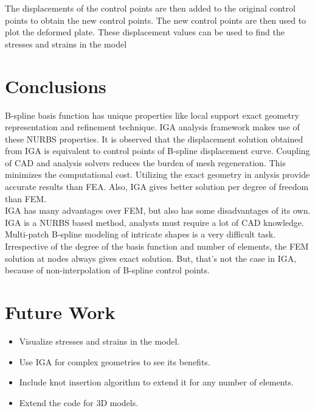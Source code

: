 \documentclass[submit,12pt]{aiaa-pretty} %
\begin{document}
The displacements of the control points are then added to the original control points to obtain the new control points. The new control points are then used to plot the deformed plate. These displacement values can be used to find the stresses and strains in the model

\section{Conclusions}
B-spline basis function has unique properties like local support exact geometry representation and refinement technique. IGA analysis framework makes use of these NURBS properties. It is observed that the displacement solution obtained from IGA is equivalent to control points of B-spline displacement curve. Coupling of CAD and analysis solvers reduces the burden of mesh regeneration. This minimizes the computational cost. Utilizing the exact geometry in anlysis provide accurate results than FEA. Also, IGA gives better solution per degree of freedom than FEM. \\
IGA has many advantages over FEM, but also has some disadvantages of its own. IGA is a NURBS based method, analysts must require a lot of CAD knowledge. Multi-patch B-spline modeling of intricate shapes is a very difficult task. Irrespective of the degree of the basis function and number of elements, the FEM solution at nodes always gives exact solution. But, that's not the case in IGA, because of non-interpolation of B-spline control points.  
\newpage
\section{Future Work}
\begin{itemize}
    \item Visualize stresses and strains in the model.
    \item Use IGA for complex geometries to see its benefits.
    \item Include knot insertion algorithm to extend it for any number of elements.
    \item Extend the code for 3D models.
\end{itemize}


 
\end{document}
